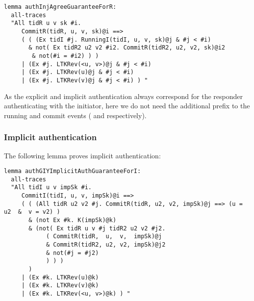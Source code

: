 \begin{lstlisting}
lemma authInjAgreeGuaranteeForR:
  all-traces
  "All tidR u v sk #i.
     CommitR(tidR, u, v, sk)@i ==>
     ( ( (Ex tidI #j. RunningI(tidI, u, v, sk)@j & #j < #i)
       & not( Ex tidR2 u2 v2 #i2. CommitR(tidR2, u2, v2, sk)@i2
        & not(#i = #i2) ) )
     | (Ex #j. LTKRev(<u, v>)@j & #j < #i)
     | (Ex #j. LTKRev(u)@j & #j < #i)
     | (Ex #j. LTKRev(v)@j & #j < #i) ) "
\end{lstlisting}

As the explicit and implicit authentication always correspond for the
responder authenticating with the initiator, here we do not need the
additional  prefix to the running and commit events
( and  respectively).

\subsubsection{Implicit authentication}

The following lemma proves implicit authentication:
\begin{lstlisting}
lemma authGIYImplicitAuthGuaranteeForI:
  all-traces
  "All tidI u v impSk #i.
     CommitI(tidI, u, v, impSk)@i ==>
     ( ( (All tidR u2 v2 #j. CommitR(tidR, u2, v2, impSk)@j ==> (u = u2  &  v = v2) )
       & (not Ex #k. K(impSk)@k)
       & (not( Ex tidR u v #j tidR2 u2 v2 #j2.
            ( CommitR(tidR,  u,  v,  impSk)@j
            & CommitR(tidR2, u2, v2, impSk)@j2
            & not(#j = #j2)
            ) ) )
       )
     | (Ex #k. LTKRev(u)@k)
     | (Ex #k. LTKRev(v)@k)
     | (Ex #k. LTKRev(<u, v>)@k) ) "
\end{lstlisting}

